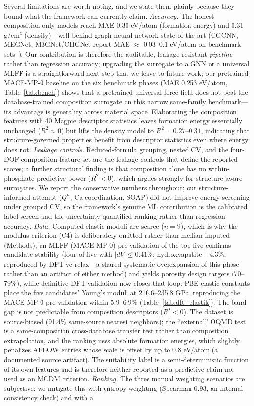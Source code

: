 \documentclass[review,11pt,a4paper]{elsarticle}
\begin{document}
Several limitations are worth noting, and we state them plainly because they bound what the framework can currently claim. \emph{Accuracy.} The honest composition-only models reach MAE 0.30 eV/atom (formation energy) and 0.31 g/cm$^3$ (density)---well behind graph-neural-network state of the art (CGCNN, MEGNet, M3GNet/CHGNet report MAE $\approx$ 0.03--0.1 eV/atom on benchmark sets~\cite{xie2018,chen2019,chen2022,deng2023}). Our contribution is therefore the auditable, leakage-resistant \emph{pipeline} rather than regression accuracy; upgrading the surrogate to a GNN or a universal MLFF is a straightforward next step that we leave to future work; our pretrained MACE-MP-0 baseline on the six benchmark phases (MAE 0.253 eV/atom, Table~\ref{tab:bench}) shows that a pretrained universal force field does not beat the database-trained composition surrogate on this narrow same-family benchmark---its advantage is generality across material space. Elaborating the composition features with 40 Magpie descriptor statistics leaves formation energy essentially unchanged ($R^2 \approx 0$) but lifts the density model to $R^2 = 0.27$--$0.31$, indicating that structure-governed properties benefit from descriptor statistics even where energy does not. \emph{Leakage controls.} Reduced-formula grouping, nested CV, and the four-DOF composition feature set are the leakage controls that define the reported scores; a further structural finding is that composition alone has no within-phosphate predictive power ($R^2<0$), which argues strongly for structure-aware surrogates. We report the conservative numbers throughout; our structure-informed attempt ($Q^n$, Ca coordination, SOAP) did not improve energy screening under grouped CV, so the framework's genuine ML contribution is the calibrated label screen and the uncertainty-quantified ranking rather than regression accuracy. \emph{Data.} Computed elastic moduli are scarce ($n=9$), which is why the modulus criterion (C4) is deliberately omitted rather than median-imputed (Methods); an MLFF (MACE-MP-0) pre-validation of the top five confirms candidate stability (four of five with $|dV| \leq 0.41\%$; hydroxyapatite $+4.3\%$, reproduced by DFT vc-relax---a shared systematic overexpansion of this phase rather than an artifact of either method) and yields porosity design targets (70--79\%), while definitive DFT validation now closes that loop: PBE elastic constants place the five candidates' Young's moduli at 216.6--235.8 GPa, reproducing the MACE-MP-0 pre-validation within 5.9--6.9\% (Table~\ref{tab:dft_elastik}). The band gap is not predictable from composition descriptors ($R^2<0$). The dataset is source-biased (91.4\% same-source nearest neighbors); the ``external'' OQMD test is a same-composition cross-database transfer test rather than composition extrapolation, and the ranking uses absolute formation energies, which slightly penalizes AFLOW entries whose scale is offset by up to 0.8 eV/atom (a documented source artifact). The suitability label is a semi-deterministic function of its own features and is therefore neither reported as a predictive claim nor used as an MCDM criterion. \emph{Ranking.} The three manual weighting scenarios are subjective; we mitigate this with entropy weighting (Spearman 0.93, an internal consistency check) and with a 
\end{document}
